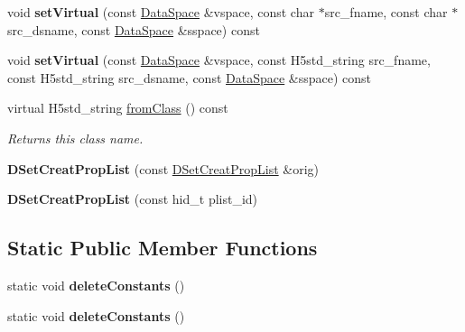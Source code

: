 \begin{DoxyCompactItemize}
void {\bfseries set\+Virtual} (const \hyperlink{class_h5_1_1_data_space}{Data\+Space} \&vspace, const char $\ast$src\+\_\+fname, const char $\ast$src\+\_\+dsname, const \hyperlink{class_h5_1_1_data_space}{Data\+Space} \&sspace) const
\item 
\mbox{\label{class_h5_1_1_d_set_creat_prop_list_ab887b57809885518c60c9eb4a98434a8}} 
void {\bfseries set\+Virtual} (const \hyperlink{class_h5_1_1_data_space}{Data\+Space} \&vspace, const H5std\+\_\+string src\+\_\+fname, const H5std\+\_\+string src\+\_\+dsname, const \hyperlink{class_h5_1_1_data_space}{Data\+Space} \&sspace) const
\item 
\mbox{\label{class_h5_1_1_d_set_creat_prop_list_aae0bda38c97a2ab85679caad38c4bb87}} 
virtual H5std\+\_\+string \hyperlink{class_h5_1_1_d_set_creat_prop_list_aae0bda38c97a2ab85679caad38c4bb87}{from\+Class} () const
\begin{DoxyCompactList}\small\item\em Returns this class name. \end{DoxyCompactList}\item 
\mbox{\label{class_h5_1_1_d_set_creat_prop_list_a56589016937912cf3ae2726e984c151f}} 
{\bfseries D\+Set\+Creat\+Prop\+List} (const \hyperlink{class_h5_1_1_d_set_creat_prop_list}{D\+Set\+Creat\+Prop\+List} \&orig)
\item 
\mbox{\label{class_h5_1_1_d_set_creat_prop_list_a424f8842860c7956ac4399664b224aba}} 
{\bfseries D\+Set\+Creat\+Prop\+List} (const hid\+\_\+t plist\+\_\+id)
\end{DoxyCompactItemize}
\subsection*{Static Public Member Functions}
\begin{DoxyCompactItemize}
\item 
\mbox{\label{class_h5_1_1_d_set_creat_prop_list_a689ccd9cd451a3fd9710b48109ec9492}} 
static void {\bfseries delete\+Constants} ()
\item 
\mbox{\label{class_h5_1_1_d_set_creat_prop_list_a689ccd9cd451a3fd9710b48109ec9492}} 
static void {\bfseries delete\+Constants} ()
\end{DoxyCompactItemize}
